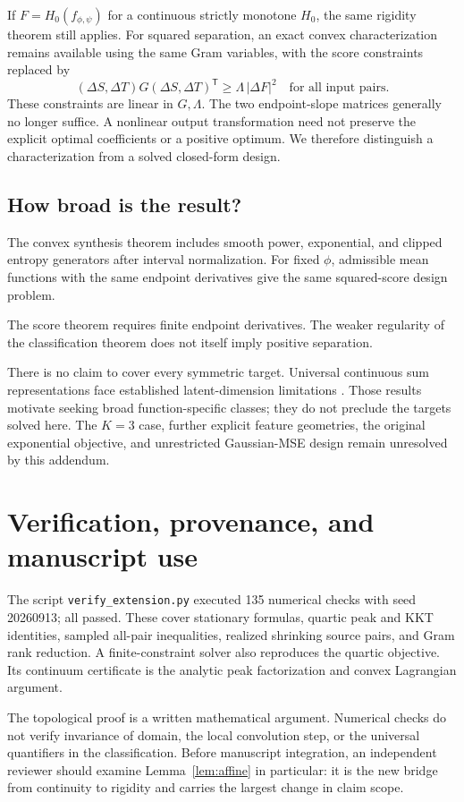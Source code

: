 \documentclass[11pt,letterpaper]{article}
\theoremstyle{remark}
\newcommand{\T}{\mathsf T}
\begin{document}
If $F=H_0(f_{\phi,\psi})$ for a continuous strictly monotone $H_0$, the same rigidity theorem still applies. For squared separation, an exact convex characterization remains available using the same Gram variables, with the score constraints replaced by
$$
 (\Delta S,\Delta T)G(\Delta S,\Delta T)^\T
 \ge\Lambda\,|\Delta F|^2
 \quad\text{for all input pairs}.
$$
These constraints are linear in $G,\Lambda$. The two endpoint-slope matrices generally no longer suffice. A nonlinear output transformation need not preserve the explicit optimal coefficients or a positive optimum. We therefore distinguish a characterization from a solved closed-form design.

\subsection{How broad is the result?}
The convex synthesis theorem includes smooth power, exponential, and clipped entropy generators after interval normalization. For fixed $\phi$, admissible mean functions with the same endpoint derivatives give the same squared-score design problem.

The score theorem requires finite endpoint derivatives. The weaker regularity of the classification theorem does not itself imply positive separation.

There is no claim to cover every symmetric target. Universal continuous sum representations face established latent-dimension limitations \cite{wagstaff19,wagstaff22}. Those results motivate seeking broad function-specific classes; they do not preclude the targets solved here. The $K=3$ case, further explicit feature geometries, the original exponential objective, and unrestricted Gaussian-MSE design remain unresolved by this addendum.

\section{Verification, provenance, and manuscript use}
The script \texttt{verify\_extension.py} executed 135 numerical checks with seed 20260913; all passed. These cover stationary formulas, quartic peak and KKT identities, sampled all-pair inequalities, realized shrinking source pairs, and Gram rank reduction. A finite-constraint solver also reproduces the quartic objective. Its continuum certificate is the analytic peak factorization and convex Lagrangian argument.

The topological proof is a written mathematical argument. Numerical checks do not verify invariance of domain, the local convolution step, or the universal quantifiers in the classification. Before manuscript integration, an independent reviewer should examine Lemma~\ref{lem:affine} in particular: it is the new bridge from continuity to rigidity and carries the largest change in claim scope.
\end{document}

